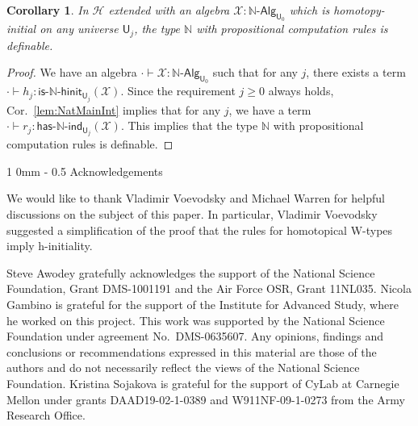 \documentclass[reqno,10pt,a4paper,oneside]{amsart}
\makeatletter
\newcommand{\X}{\mathcal{X}}
\newcommand{\nat}{\ensuremath{\mathbb{N}}}
\newcommand{\UU}{\mathsf{U}}
\newcommand{\NatAlg}{\nat\text{-}\mathsf{Alg}}
\newcommand{\HasNatInd}{\mathsf{has}\text{-}\nat\text{-}\mathsf{ind}}
\newcommand{\IsNatHInit}{\mathsf{is}\text{-}\nat\text{-}\mathsf{hinit}}
\newcommand{\Hint}{\mathcal{H}}
\renewcommand{\section}{\@startsection
  {section}%
   {1}%
  {0mm}%
   {-\baselineskip}%
  {0.5\baselineskip}%
   {\Large\bfseries}}%
\numberwithin{equation}{section}
\theoremstyle{mythm}
\newtheorem{corollary}[theorem]{Corollary}
\theoremstyle{mydef}
\theoremstyle{myrmk}
\makeatother
\begin{document}
\begin{corollary}\label{lem:NatCharInt}
In $\Hint$ extended with an algebra $\X : \NatAlg_{\UU_0}$ which is homotopy-initial on any universe $\UU_j$, the type $\nat$ with propositional computation rules is definable. 
\end{corollary}
\begin{proof}
We have an algebra $\cdot \vdash \X : \NatAlg_{\UU_0}$ such that for any $j$, there exists a term $\cdot \vdash h_j  : \IsNatHInit_{\UU_j}(\X)$. Since the requirement $j \geq 0$ always holds, Cor.~\ref{lem:NatMainInt} implies that for any $j$, we have a term $\cdot \vdash r_j : \HasNatInd_{\UU_j}(\X)$. This implies that the type $\nat$ with propositional computation rules is definable.
\end{proof}






\section{Acknowledgements}

We would like to thank Vladimir Voevodsky and Michael Warren for helpful discussions
on the subject of this paper. In particular, Vladimir Voevodsky suggested a simplification of the 
proof that the rules for homotopical W-types imply h-initiality.

Steve Awodey gratefully acknowledges the support of the National Science Foundation, Grant DMS-1001191
 and the Air Force OSR, Grant 11NL035.
Nicola Gambino is grateful for the support of the Institute for Advanced Study, where
he worked on this project. This work was supported by the National Science Foundation 
under agreement No.\ DMS-0635607. Any opinions, findings and conclusions or recommendations
expressed in this material are those of the authors and do not necessarily reflect the views of
the National Science Foundation.
Kristina Sojakova is grateful for the support of CyLab at Carnegie
Mellon under grants DAAD19-02-1-0389 and W911NF-09-1-0273 from the Army
Research Office.






                        
\end{document}
